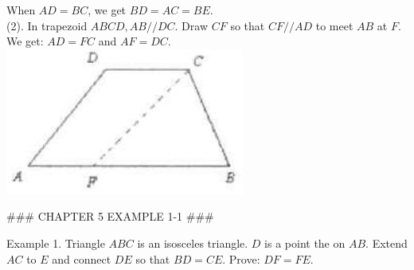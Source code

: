 \documentclass[10pt]{article}
\begin{document}
When \(A D=B C\), we get \(B D=A C=B E\).\\
(2). In trapezoid \(A B C D, A B / / D C\). Draw \(C F\) so that \(C F / / A D\) to meet \(A B\) at \(F\). We get: \(A D=F C\) and \(A F=D C\).\\
\includegraphics[max width=\textwidth, center]{2025_04_17_97bc1f7e44d93c271a88g-101(2)}


### CHAPTER 5 EXAMPLE 1-1 ###

Example 1. Triangle \(A B C\) is an isosceles triangle. \(D\) is a point the on \(A B\). Extend \(A C\) to \(E\) and connect \(D E\) so that \(B D=C E\). Prove: \(D F=F E\).
\end{document}
